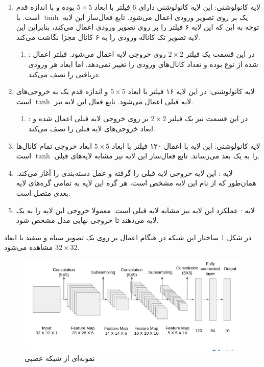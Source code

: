 \documentclass[12pt, a4paper]{article}
\begin{document}
\begin{enumerate}
    \item لایه کانولوشنی: این لایه کانولوشنی دارای 6 فیلتر با ابعاد $5 \times 5$ بوده و با
    اندازه قدم یک بر روی تصویر ورودی اعمال می‌شود. تابع فعال‌ساز این لایه $\tanh$ است. با توجه به این که
    این لایه ۶ فیلتر را بر روی تصویر ورودی اعمال می‌کند، بنابراین این لایه تصویر تک کاناله ورودی را به
    ۶ کانال مجزا نگاشت می‌کند.
    \begin{enumerate}
        \item {}: در این قسمت یک فیلتر $2 \times 2$ روی خروجی لایه اعمال می‌شود. فیلتر اعمال شده
        از نوع  بوده و تعداد کانال‌های ورودی را تغییر نمی‌دهد. اما ابعاد هر ورودی دریافتی
        را نصف می‌کند.
    \end{enumerate}
    \item لایه کانولوشنی: در این لایه ۱۶ فیلتر با ابعاد $5 \times 5$ و اندازه قدم یک به خروجی‌های لایه قبلی اعمال می‌شود.
    تابع فعال این لایه نیز $\tanh$ است.
    \begin{enumerate}
        \item {}: در این قسمت نیز یک فیلتر $2 \times 2$ بر روی خروجی لایه قبلی اعمال شده و ابعاد خروجی‌های
        لایه قبلی را نصف می‌کند.
    \end{enumerate}
    \item لایه کانولوشنی: این لایه با اعمال ۱۲۰ فیلتر با ابعاد $5 \times 5$ ابعاد خروجی تمام کانال‌ها را به یک بعد می‌رساند.
    تابع فعال‌ساز این لایه نیز مشابه لایه‌های قبلی $\tanh$ است.
    \item لایه : این لایه‌ خروجی لایه قبلی را گرفته و عمل دسته‌بندی را آغاز می‌کند. همان‌طور که از نام این
    لایه مشخص است، هر گره این لایه به تمامی گره‌های لایه بعدی متصل است.
    \item لایه : عملکرد این لایه نیز مشابه لایه  قبلی است. معمولا خروجی این لایه
    را به یک لایه  می‌دهند تا خروجی نهایی مدل مشخص شود.
\end{enumerate}

در شکل \ref{lenet} ساختار این شبکه در هنگام اعمال بر روی یک تصویر سیاه‌ و سفید با ابعاد $32 \times 32$ مشاهده می‌شود.

\begin{figure}[h]
    \centering
    \includegraphics[width=0.8\linewidth]{images/lenet.png}
    \caption{نمونه‌ای از شبکه عصبی }
    \label{lenet}
\end{figure}
\end{document}
